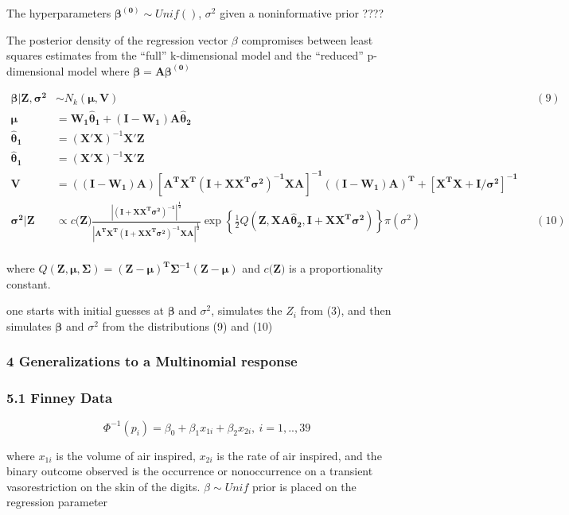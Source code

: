 \documentclass[
]{article}
\begin{document}
The hyperparameters \(\boldsymbol{\beta^{(0)}}\sim Unif()\),
\(\sigma^2\) given a noninformative prior {????}

The posterior density of the regression vector \(\beta\) compromises
between least squares estimates from the ``full'' k-dimensional model
and the ``reduced'' p-dimensional model where
\(\boldsymbol{\beta=A\beta^{(0)}}\)

\[
\begin{align} 
\boldsymbol{\beta|Z,\sigma^2}&\sim N_k(\boldsymbol{\mu,V}) &&(9)\\ 
\boldsymbol{\mu}&=\boldsymbol{W_1\hat\theta_1+(I-W_1)A\hat\theta_2} \\
\boldsymbol{\hat\theta_1}&=(\mathbf{X'X})^{-1}\mathbf{X'Z} \\
\boldsymbol{\hat\theta_1}&=(\mathbf{X'X})^{-1}\mathbf{X'Z} \\
\boldsymbol{V}&=\boldsymbol{((I-W_1)A)[A^TX^T(I+XX^T\sigma^2)^{-1}XA]^{-1}((I-W_1)A)^T+[X^TX+I/\sigma^2]^{-1}} \\
\boldsymbol{\sigma^2|Z}&\propto c(\mathbf{Z)\frac{|(I+XX^T\sigma^2)^{-1}|^{\frac12}}{|A^TX^T(I+XX^T\sigma^2)^{-1}XA|^{\frac12}}}\exp{\left\{\frac12Q(\boldsymbol{Z,XA\hat\theta_2,I+XX^T\sigma^2})\right\}}\pi(\sigma^2) &&(10)\\ 
\end{align}
\]

where
\(Q(\boldsymbol{Z,\mu,\Sigma})=\boldsymbol{(Z-\mu)^T\Sigma^{-1}(Z-\mu)}\)
and \(c(\mathbf{Z)}\) is a proportionality constant.

one starts with initial guesses at \(\boldsymbol{\beta}\) and
\(\sigma^2\), simulates the \(Z_i\) from (3), and then simulates
\(\boldsymbol{\beta}\) and \(\sigma^2\) from the distributions (9) and
(10)

\hypertarget{generalizations-to-a-multinomial-response}{%
\subsubsection{4 Generalizations to a Multinomial
response}\label{generalizations-to-a-multinomial-response}}

\hypertarget{finney-data}{%
\subsubsection{5.1 Finney Data}\label{finney-data}}

\[\Phi^{-1}(p_i)=\beta_0+\beta_1x_{1i}+\beta_2x_{2i},\ i=1,..,39\]

where \(x_{1i}\) is the volume of air inspired, \(x_{2i}\) is the rate
of air inspired, and the binary outcome observed is the occurrence or
nonoccurrence on a transient vasorestriction on the skin of the digits.
\(\beta\sim Unif\) prior is placed on the regression parameter
\end{document}
